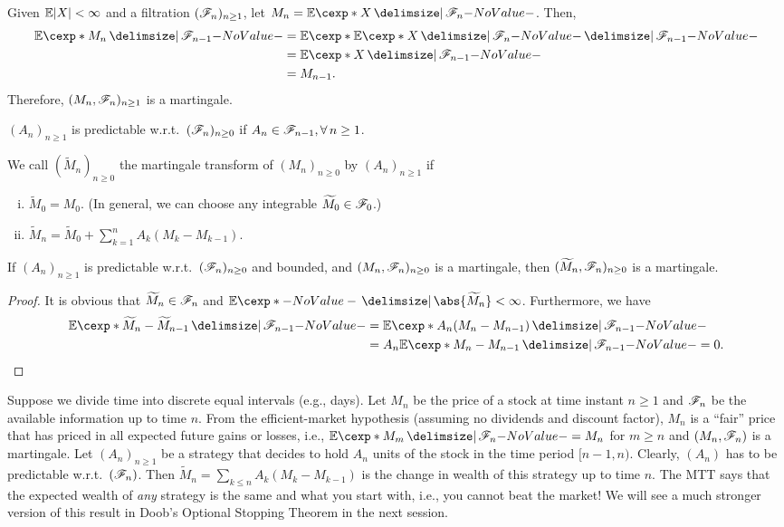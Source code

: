 \documentclass[12pt]{article}
\begin{document}
\begin{Example}\label{ex:wk12_mex_5}
Given $\E|X|<\infty$ and a filtration $(\mathscr{F}_n)_{n\geq1}$, let $M_n=\E[X \given \scF_n]$. Then, 
\begin{align*}
\E [M_n \given \scF_{n-1}]
&=\E [{\E[X \given \scF_n]} \given \scF_{n-1}]\\
&=\E[X \given \scF_{n-1}]\\
&=M_{n-1}.
\end{align*}
Therefore, $(M_{n},\mathscr{F}_n)_{n\geq1}$ is a martingale.
\end{Example}

\begin{Definition}
$(A_n)_{n\geq1}$ is predictable w.r.t.\ $(\mathscr{F}_n)_{n\geq 0}$ if $A_n \in \scF_{n-1}, \forall n  \geq 1$.
\end{Definition}

We call $(\widetilde{M}_n)_{n\geq0}$ the martingale transform of $(M_n)_{n\geq0}$ by $(A_n)_{n\geq1}$ if
\begin{enumerate}[(i)]
\item $\widetilde{M}_0 = M_0$. (In general, we can choose any integrable $\widetilde{M}_0\in\mathscr{F}_0$.)
\item $\widetilde{M}_n = \widetilde{M}_0 + \sum_{k=1}^n A_k(M_k-M_{k-1})$. 
\end{enumerate}
%
\begin{Theorem}[MTT] \label{wk12:MTT}
If $(A_n)_{n\geq1}$ is predictable w.r.t.\ $(\mathscr{F}_n)_{n\geq0}$ and bounded, and $(M_n,\mathscr{F}_n)_{n\geq0}$ is a martingale, then $(\widetilde{M}_n, \mathscr{F}_n)_{n\geq0}$ is a martingale.
\end{Theorem}
\begin{proof}
It is obvious that $\widetilde{M}_n \in \mathscr{F}_n$ and $\E\abs{\widetilde{M}_n} < \infty$. Furthermore, we have 
\begin{align*}
\E[\widetilde{M}_n - \widetilde{M}_{n-1} \given \scF_{n-1}]
&= \E[A_n(M_n - M_{n-1}) \given \scF_{n-1}] \\
&= A_n\E[M_n - M_{n-1} \given \scF_{n-1}] = 0.
\end{align*}
\end{proof}

\begin{Example}
Suppose we divide time into discrete equal intervals (e.g., days). Let $M_n$ be the price of a stock at time instant $n\geq1$ and $\mathscr{F}_n$ be the available information up to time $n$. From the efficient-market hypothesis (assuming no dividends and discount factor), $M_n$ is a ``fair'' price that has priced in all expected future gains or losses, i.e., $\E[M_m \given \scF_n] = M_n$ for $m\geq n$ and $(M_n,\mathscr{F}_n)$ is a martingale. Let $(A_n)_{n\geq1}$ be a strategy that decides to hold $A_n$ units of the stock in the time period $[n-1,n)$. Clearly, $(A_n)$ has to be predictable w.r.t.\ $(\mathscr{F}_n)$. Then $\widetilde{M}_n= \sum_{k\leq n} A_k(M_k-M_{k-1})$ is the change in wealth of this strategy up to time $n$. The MTT says that the expected wealth of \emph{any} strategy is the same and what you start with, i.e., you cannot beat the market! We will see a much stronger version of this result in Doob's Optional Stopping Theorem in the next session.
\end{Example}

%

\end{document}
